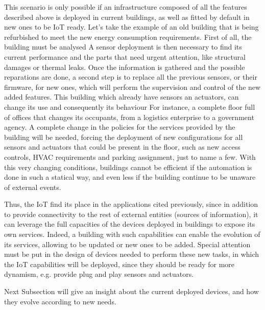 This scenario is only possible if an infrastructure composed of all the features described above is deployed in current buildings, as well as fitted by default in new ones to be IoT ready.
Let's take the example of an old building that is being refurbished to meet the new energy consumption requirements.
First of all, the building must be analysed
A sensor deployment is then necessary to find its current performance and the parts that need urgent attention, like structural damages or thermal leaks.
Once the information is gathered and the possible reparations are done, a second step is to replace all the previous sensors, or their firmware, for new ones, which will perform the supervision and control of the new added features.
This building which already have sensors an actuators, can change its use and consequently its behaviour
For instance, a complete floor full of offices that changes its occupants, from a logistics enterprise to a government agency.
A complete change in the policies for the services provided by the building will be needed, forcing the deployment of new configurations for all sensors and actuators that could be present in the floor, such as new access controls, HVAC requirements and parking assignment, just to name a few.
With this very changing conditions, buildings cannot be efficient if the automation is done in such a statical way, and even less if the building continue to be unaware of external events.

Thus, the IoT find its place in the applications cited previously, since in addition to provide connectivity to the rest of external entities (sources of information), it can leverage the full capacities of the devices deployed in buildings to expose its own services. 
Indeed, a building with such capabilities can enable the evolution of its services, allowing to be updated or new ones to be added.
Special attention must be put in the design of devices needed to perform these new tasks, in which the IoT capabilities will be deployed, since they should be ready for more dynamism, e.g. provide plug and play sensors and actuators.

Next Subsection will give an insight about the current deployed devices, and how they evolve according to new needs.
